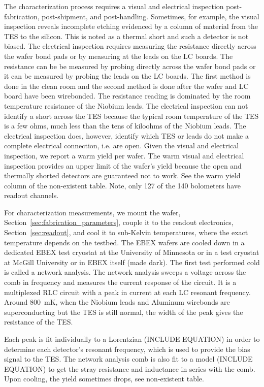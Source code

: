 The characterization process requires a visual and electrical inspection post-fabrication, post-shipment, and post-handling. 
Sometimes, for example, the visual inspection reveals incomplete etching evidenced by a column of material from the TES to the silicon. 
This is noted as a thermal short and such a detector is not biased. 
The electrical inspection requires measuring the resistance directly across the wafer bond pads or by measuring at the leads on the \ac{LC} boards. 
The resistance can be be measured by probing directly across the wafer bond pads or it can be measured by probing the leads on the \ac{LC} boards. 
The first method is done in the clean room and the second method is done after the wafer and LC board have been wirebonded. 
The resistance reading is dominated by the room temperature resistance of the Niobium leads. 
The electrical inspection can not identify a short across the \ac{TES} because the typical room temperature of the TES is a few ohms, much less than the tens of kiloohms of the Niobium leads. 
The electrical inspection does, however, identify which \ac{TES} or leads do not make a complete electrical connection, i.e. are open. 
Given the visual and electrical inspection, we report a warm yield per wafer. 
The warm visual and electrical inspection provides an upper limit of the wafer's yield because the open and thermally shorted detectors are guaranteed not to work. 
See the warm yield column of the non-existent table. 
Note, only 127 of the 140 bolometers have readout channels. 

For characterization measurements, we mount the wafer, Section~\ref{sec:fabrication_parameters}, couple it to the readout electronics, Section~\ref{sec:readout}, and cool it to sub-Kelvin temperatures, where the exact temperature depends on the testbed. 
The \ac{EBEX} wafers are cooled down in a dedicated \ac{EBEX} test cryostat at the University of Minnesota or in a test cryostat at McGill University or in \ac{EBEX} itself (made dark). 
The first test performed cold is called a network analysis. 
The network analysis sweeps a voltage across the comb in frequency and measures the current response of the circuit. 
It is a multiplexed RLC circuit with a peak in current at each LC resonant frequency. 
Around 800~mK, when the Niobium leads and Aluminum wirebonds are superconducting but the TES is still normal, the width of the peak gives the resistance of the TES. 

Each peak is fit individually to a Lorentzian (INCLUDE EQUATION) in order to determine each detector's resonant frequency, which is used to provide the bias signal to the TES. 
The network analysis comb is also fit to a model (INCLUDE EQUATION) to get the stray resistance and inductance in series with the comb. 
Upon cooling, the yield sometimes drops, see non-existent table. 

